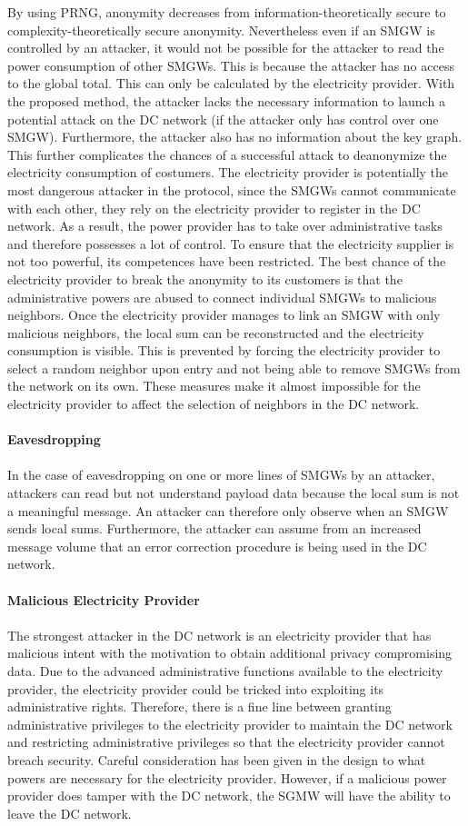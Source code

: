 By using PRNG, anonymity decreases from information-theoretically secure to complexity-theoretically secure anonymity. Nevertheless even if an SMGW is controlled by an attacker, it would not be possible for the attacker to read the power consumption of other SMGWs. This is because the attacker has no access to the global total. This can only be calculated by the electricity provider. With the proposed method, the attacker lacks the necessary information to launch a potential attack on the DC network (if the attacker only has control over one SMGW). Furthermore, the attacker also has no information about the key graph. This further complicates the chances of a successful attack to deanonymize the electricity consumption of costumers. The electricity provider is potentially the most dangerous attacker in the protocol, since the SMGWs cannot communicate with each other, they rely on the electricity provider to register in the DC network. As a result, the power provider has to take over administrative tasks and therefore possesses a lot of control. To ensure that the electricity supplier is not too powerful, its competences have been restricted. The best chance of the electricity provider to break the anonymity to its customers is that the administrative powers are abused to connect individual SMGWs to malicious neighbors. Once the electricity provider manages to link an SMGW with only malicious neighbors, the local sum can be reconstructed and the electricity consumption is visible. This is prevented by forcing the electricity provider to select a random neighbor upon entry and not being able to remove SMGWs from the network on its own. These measures make it almost impossible for the electricity provider to affect the selection of neighbors in the DC network.
\\
\\
\textbf{Eavesdropping}
\\
\\
In the case of eavesdropping on one or more lines of SMGWs by an attacker, attackers can read but not understand payload data because the local sum is not a meaningful message. An attacker can therefore only observe when an SMGW sends local sums. Furthermore, the attacker can assume from an increased message volume that an error correction procedure is being used in the DC network. 
\\
\\
\textbf{Malicious Electricity Provider}
\\
\\
The strongest attacker in the DC network is an electricity provider that has malicious intent with the motivation to obtain additional privacy compromising data. Due to the advanced administrative functions available to the electricity provider, the electricity provider could be tricked into exploiting its administrative rights. Therefore, there is a fine line between granting administrative privileges to the electricity provider to maintain the DC network and restricting administrative privileges so that the electricity provider cannot breach security. Careful consideration has been given in the design to what powers are necessary for the electricity provider. However, if a malicious power provider does tamper with the DC network, the SGMW will have the ability to leave the DC network.
